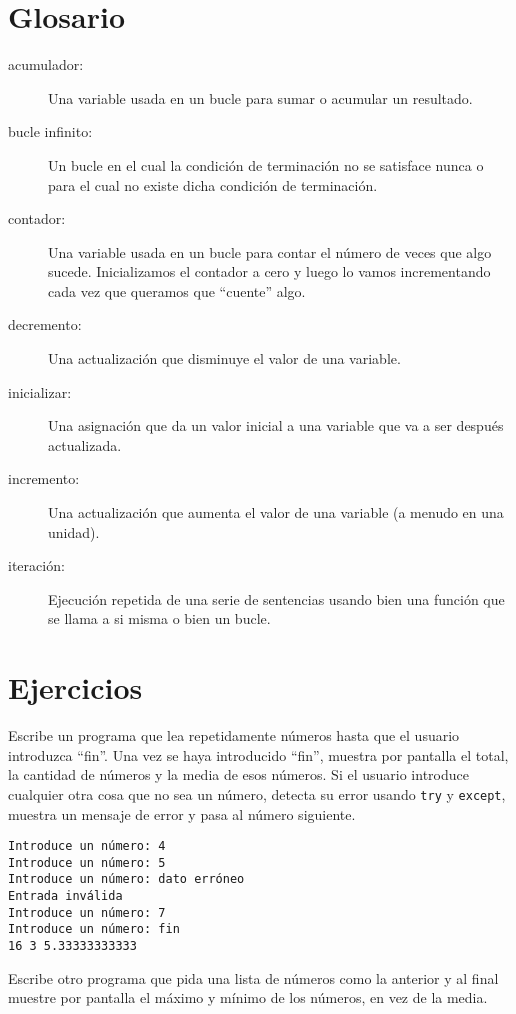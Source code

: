 \section{Glosario}

\begin{description}

\item[acumulador:] Una variable usada en un bucle para sumar o
acumular un resultado.

\item[bucle infinito:] Un bucle en el cual la condición de terminación no
se satisface nunca o para el cual no existe dicha condición de terminación.

\item[contador:] Una variable usada en un bucle para contar el número
de veces que algo sucede. Inicializamos el contador a
cero y luego lo vamos incrementando cada vez que queramos que
``cuente'' algo.

\item[decremento:] Una actualización que disminuye el valor de una variable.

\item[inicializar:] Una asignación que da un valor inicial a
una variable que va a ser después actualizada.

\item[incremento:] Una actualización que aumenta el valor de una variable
(a menudo en una unidad).

\item[iteración:] Ejecución repetida de una serie de sentencias usando
bien una función que se llama a si misma o bien un bucle.

\end{description}


\section{Ejercicios}

\begin{ex}
Escribe un programa que lea repetidamente números hasta que el usuario
introduzca ``fin''.
Una vez se haya introducido ``fin'', muestra por pantalla el total, la cantidad de números y la media
de esos números. Si el usuario introduce cualquier otra cosa que no sea un número,
detecta su error usando {\tt try} y {\tt except},
muestra un mensaje de error y pasa al número siguiente.

\begin{verbatim}
Introduce un número: 4
Introduce un número: 5
Introduce un número: dato erróneo
Entrada inválida
Introduce un número: 7
Introduce un número: fin
16 3 5.33333333333
\end{verbatim}
\end{ex}

\begin{ex}
Escribe otro programa que pida una lista de números como la anterior
y al final muestre por pantalla el máximo y mínimo de los números, en vez de la media.
\end{ex}


